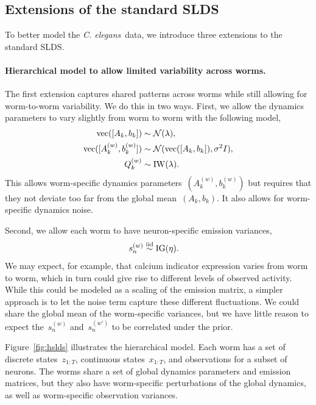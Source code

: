 \documentclass{article}
\newcommand{\celegans}{\textit{C. elegans}}
\begin{document}
\subsection{Extensions of the standard SLDS}
\label{sec:extensions}

To better model the \celegans~data, we introduce three extensions
to the standard SLDS.

\paragraph{Hierarchical model to allow limited variability across worms.}
The first extension captures shared patterns across worms while
still allowing for worm-to-worm variability.  We do this in
two ways. First, we allow the dynamics parameters to vary
slightly from worm to worm with the following model,
\begin{align*}
  \mathrm{vec}([A_k, b_k]) &\sim \mathcal{N}(\lambda), \\
  \mathrm{vec}([A_k^{(w)}, b_k^{(w)}]) &\sim \mathcal{N}(\mathrm{vec}([A_k, b_k]), \sigma^2 I), \\
  Q_k^{(w)} &\sim \mathrm{IW}(\lambda).
\end{align*}
This allows worm-specific dynamics parameters~$(A_k^{(w)}, b_k^{(w)})$ but
requires that they not deviate too far from the global mean~$(A_k, b_k)$.
It also allows for worm-specific dynamics noise. 

Second, we allow each worm to have neuron-specific emission variances,
\begin{align*}
  s_{n}^{(w)} & \stackrel{\text{iid}}{\sim} \mathrm{IG}(\eta).
\end{align*}
We may expect, for example, that calcium indicator expression
varies from worm to worm, which in turn could give rise to
different levels of observed activity.  While this could be
modeled as a scaling of the emission matrix, a simpler approach
is to let the noise term capture these different fluctuations.
We could share the global mean of the worm-specific variances,
but we have little reason to expect the~$s_{n}^{(w)}$ and~$s_{n}^{(w')}$
to be correlated under the prior. 

Figure~\ref{fig:hslds} illustrates the hierarchical model.  Each
worm has a set of discrete states~$z_{1:T}$, continuous states~$x_{1:T}$,
and observations for a subset of neurons.  The worms share a set of
global dynamics parameters and emission matrices, but they also
have worm-specific perturbations of the global dynamics, as well as
worm-specific observation variances. 
\end{document}

